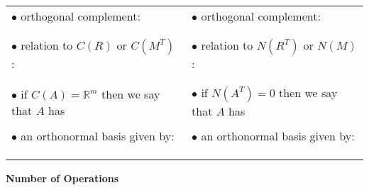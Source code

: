 \documentclass[11pt]{article}
\newcommand{\rr}{\mathbb{R}}
\begin{document}
\begin{tabular}{ l | l }
$\bullet$ orthogonal complement: & $\bullet$ orthogonal complement: \\ \\ \\
$\bullet$ relation to $C(R)$ or $C(M^T)$ : & $\bullet$ relation to $N(R^T)$ or $N(M)$ : \\ \\ \\
\makecell[l]{$\bullet$ if $C(A) = \rr^m$ then we say that $A$ has\\ \\ \qquad  \underline{\phantom{aaaaaaaaaaaaaaaaaaaaaaaaaaaaaaaaa}}} & \makecell[l]{$\bullet$ if $N(A^T) = 0$ then we say that $A$ has\\ \\ \qquad  \underline{\phantom{aaaaaaaaaaaaaaaaaaaaaaaaaaaaaaaaa}}} \\ \\
$\bullet$ an orthonormal basis given by: & $\bullet$ an orthonormal basis given by: \\ \\ \\  \\
\end{tabular}

\pagebreak 
\begin{center}
\textbf{Number of Operations}
\end{center}
\end{document}
